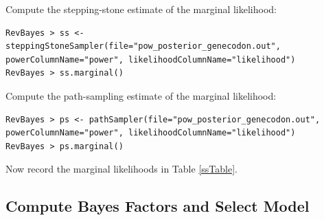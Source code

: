 Compute the stepping-stone estimate of the marginal likelihood:
{\tt \begin{snugshade*}
\begin{lstlisting}
RevBayes > ss <- steppingStoneSampler(file="pow_posterior_genecodon.out", powerColumnName="power", likelihoodColumnName="likelihood")
RevBayes > ss.marginal() 
\end{lstlisting}
\end{snugshade*}}

Compute the path-sampling estimate of the marginal likelihood:
{\tt \begin{snugshade*}
\begin{lstlisting}
RevBayes > ps <- pathSampler(file="pow_posterior_genecodon.out", powerColumnName="power", likelihoodColumnName="likelihood")
RevBayes > ps.marginal() 
\end{lstlisting}
\end{snugshade*}}

Now record the marginal likelihoods in Table \ref{ssTable}.



\bigskip
\subsection{Compute Bayes Factors and Select Model}


